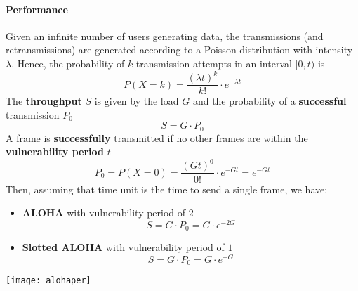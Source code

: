 \paragraph{Performance}
Given an infinite number of users generating data, the transmissions (and retransmissions) are generated according to a Poisson distribution with intensity $\lambda$. Hence, the probability of $k$ transmission attempts in an interval $[0,t)$ is
\begin{equation*}
	P(X=k)=\frac{(\lambda t)^k}{k!}\cdot e^{-\lambda t}
\end{equation*}
The \textbf{throughput} $S$ is given by the load $G$ and the probability of a \textbf{successful} transmission $P_0$
\begin{equation*}
	S=G \cdot P_0
\end{equation*}
A frame is \textbf{successfully} transmitted if no other frames are within the \textbf{vulnerability period} $t$
\begin{equation*}
	P_0 = P(X=0)=\frac{(Gt)^0}{0!}\cdot e^{-Gt} = e^{-Gt}
\end{equation*}
Then, assuming that time unit is the time to send a single frame, we have:
\begin{itemize}
	\item \textbf{ALOHA} with vulnerability period of $2$
	\begin{equation*}
		S=G\cdot P_0 = G \cdot e^{-2G}
	\end{equation*}
	\item \textbf{Slotted ALOHA} with vulnerability period of $1$
	\begin{equation*}
		S=G\cdot P_0 = G \cdot e^{-G}
	\end{equation*}
\end{itemize}
\begin{center}
	\texttt{[image: alohaper]}
\end{center}

\newpage

